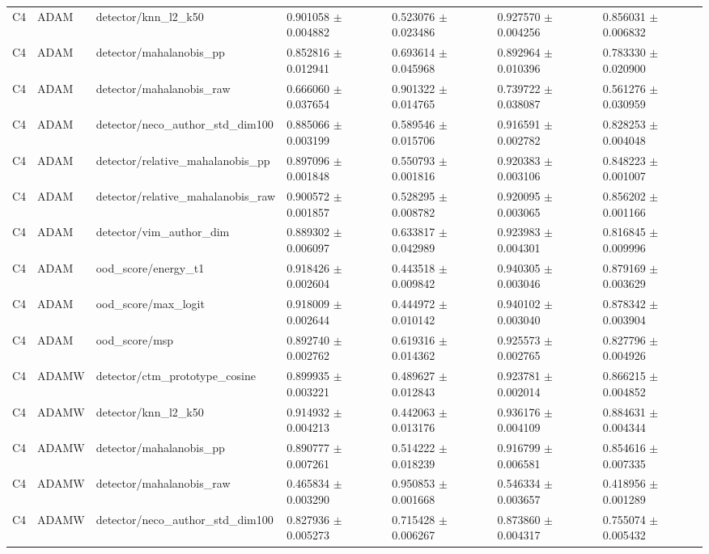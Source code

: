 \begin{longtable}{lllllll}
C4 & ADAM & detector/knn\_l2\_k50 & 0.901058 $\pm$ 0.004882 & 0.523076 $\pm$ 0.023486 & 0.927570 $\pm$ 0.004256 & 0.856031 $\pm$ 0.006832 \\
C4 & ADAM & detector/mahalanobis\_pp & 0.852816 $\pm$ 0.012941 & 0.693614 $\pm$ 0.045968 & 0.892964 $\pm$ 0.010396 & 0.783330 $\pm$ 0.020900 \\
C4 & ADAM & detector/mahalanobis\_raw & 0.666060 $\pm$ 0.037654 & 0.901322 $\pm$ 0.014765 & 0.739722 $\pm$ 0.038087 & 0.561276 $\pm$ 0.030959 \\
C4 & ADAM & detector/neco\_author\_std\_dim100 & 0.885066 $\pm$ 0.003199 & 0.589546 $\pm$ 0.015706 & 0.916591 $\pm$ 0.002782 & 0.828253 $\pm$ 0.004048 \\
C4 & ADAM & detector/relative\_mahalanobis\_pp & 0.897096 $\pm$ 0.001848 & 0.550793 $\pm$ 0.001816 & 0.920383 $\pm$ 0.003106 & 0.848223 $\pm$ 0.001007 \\
C4 & ADAM & detector/relative\_mahalanobis\_raw & 0.900572 $\pm$ 0.001857 & 0.528295 $\pm$ 0.008782 & 0.920095 $\pm$ 0.003065 & 0.856202 $\pm$ 0.001166 \\
C4 & ADAM & detector/vim\_author\_dim & 0.889302 $\pm$ 0.006097 & 0.633817 $\pm$ 0.042989 & 0.923983 $\pm$ 0.004301 & 0.816845 $\pm$ 0.009996 \\
C4 & ADAM & ood\_score/energy\_t1 & 0.918426 $\pm$ 0.002604 & 0.443518 $\pm$ 0.009842 & 0.940305 $\pm$ 0.003046 & 0.879169 $\pm$ 0.003629 \\
C4 & ADAM & ood\_score/max\_logit & 0.918009 $\pm$ 0.002644 & 0.444972 $\pm$ 0.010142 & 0.940102 $\pm$ 0.003040 & 0.878342 $\pm$ 0.003904 \\
C4 & ADAM & ood\_score/msp & 0.892740 $\pm$ 0.002762 & 0.619316 $\pm$ 0.014362 & 0.925573 $\pm$ 0.002765 & 0.827796 $\pm$ 0.004926 \\
C4 & ADAMW & detector/ctm\_prototype\_cosine & 0.899935 $\pm$ 0.003221 & 0.489627 $\pm$ 0.012843 & 0.923781 $\pm$ 0.002014 & 0.866215 $\pm$ 0.004852 \\
C4 & ADAMW & detector/knn\_l2\_k50 & 0.914932 $\pm$ 0.004213 & 0.442063 $\pm$ 0.013176 & 0.936176 $\pm$ 0.004109 & 0.884631 $\pm$ 0.004344 \\
C4 & ADAMW & detector/mahalanobis\_pp & 0.890777 $\pm$ 0.007261 & 0.514222 $\pm$ 0.018239 & 0.916799 $\pm$ 0.006581 & 0.854616 $\pm$ 0.007335 \\
C4 & ADAMW & detector/mahalanobis\_raw & 0.465834 $\pm$ 0.003290 & 0.950853 $\pm$ 0.001668 & 0.546334 $\pm$ 0.003657 & 0.418956 $\pm$ 0.001289 \\
C4 & ADAMW & detector/neco\_author\_std\_dim100 & 0.827936 $\pm$ 0.005273 & 0.715428 $\pm$ 0.006267 & 0.873860 $\pm$ 0.004317 & 0.755074 $\pm$ 0.005432 \\

\end{longtable}
